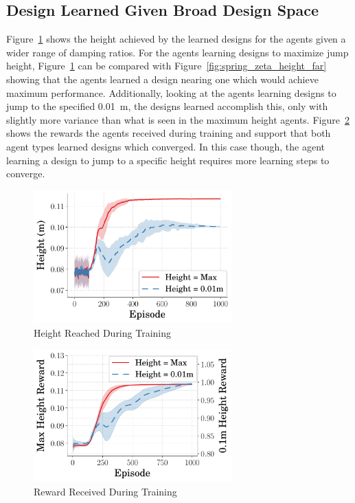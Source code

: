 \documentclass[letterpaper, 10 pt, conference]{ieeeconf}  %
\begin{document}
\subsection{Design Learned Given Broad Design Space}

Figure~\ref{fig:height_vs_step_far} shows the height achieved by the learned designs for the agents given a wider range of damping ratios. For the agents learning designs to maximize jump height, Figure~\ref{fig:height_vs_step_far} can be compared with Figure~\ref{fig:spring_zeta_height_far} showing that the agents learned a design nearing one which would achieve maximum performance. Additionally, looking at the agents learning designs to jump to the specified 0.01~m, the designs learned accomplish this, only with slightly more variance than what is seen in the maximum height agents. Figure~\ref{fig:rew_vs_step_far} shows the rewards the agents received during training and support that both agent types learned designs which converged. In this case though, the agent learning a design to jump to a specific height requires more learning steps to converge. 
%
\begin{figure}[t]
        \begin{center}
        \includegraphics[width = 3in]{figures/wide_design_space/HeightVsTime_2021-10-12_145005.pdf}  
        \caption{Height Reached During Training}
        \label{fig:height_vs_step_far}
        \end{center}
        \end{figure}
%
\begin{figure}[t]
        \begin{center}
        \includegraphics[width = 3in]{figures/wide_design_space/RewVsTime_2021-10-12_145004.pdf}  
        \caption{Reward Received During Training}
        \label{fig:rew_vs_step_far}
        \end{center}
        \end{figure}
%
\end{document}
